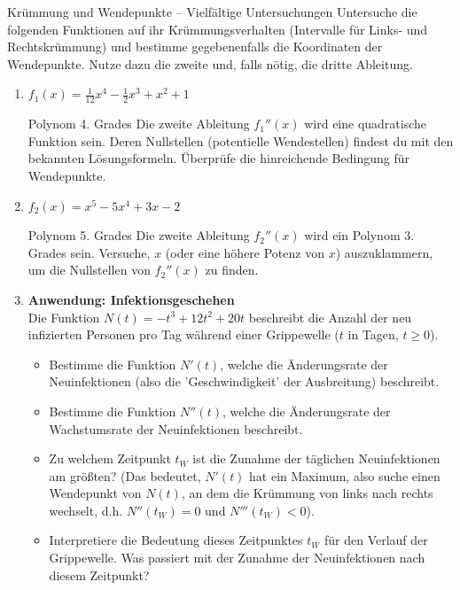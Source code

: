\begin{aufgabenumgebung}{Krümmung und Wendepunkte – Vielfältige Untersuchungen}
Untersuche die folgenden Funktionen auf ihr Krümmungsverhalten (Intervalle für Links- und Rechtskrümmung) und bestimme gegebenenfalls die Koordinaten der Wendepunkte. Nutze dazu die zweite und, falls nötig, die dritte Ableitung.
\begin{enumerate}
    \item $f_1(x) = \frac{1}{12}x^4 - \frac{1}{2}x^3 + x^2 + 1$
        \begin{tippumgebung}{Polynom 4. Grades}
        Die zweite Ableitung $f_1''(x)$ wird eine quadratische Funktion sein. Deren Nullstellen (potentielle Wendestellen) findest du mit den bekannten Lösungsformeln. Überprüfe die hinreichende Bedingung für Wendepunkte.
        \end{tippumgebung}

    \item $f_2(x) = x^5 - 5x^4 + 3x - 2$
        \begin{tippumgebung}{Polynom 5. Grades}
        Die zweite Ableitung $f_2''(x)$ wird ein Polynom 3. Grades sein. Versuche, $x$ (oder eine höhere Potenz von $x$) auszuklammern, um die Nullstellen von $f_2''(x)$ zu finden.
        \end{tippumgebung}

    \item \textbf{Anwendung: Infektionsgeschehen} \\
        Die Funktion $N(t) = -t^3 + 12t^2 + 20t$ beschreibt die Anzahl der neu infizierten Personen pro Tag während einer Grippewelle ($t$ in Tagen, $t \ge 0$).
        \begin{itemize}
            \item Bestimme die Funktion $N'(t)$, welche die Änderungsrate der Neuinfektionen (also die 'Geschwindigkeit' der Ausbreitung) beschreibt.
            \item Bestimme die Funktion $N''(t)$, welche die Änderungsrate der Wachstumsrate der Neuinfektionen beschreibt.
            \item Zu welchem Zeitpunkt $t_W$ ist die Zunahme der täglichen Neuinfektionen am größten? (Das bedeutet, $N'(t)$ hat ein Maximum, also suche einen Wendepunkt von $N(t)$, an dem die Krümmung von links nach rechts wechselt, d.h. $N''(t_W)=0$ und $N'''(t_W)<0$).
            \item Interpretiere die Bedeutung dieses Zeitpunktes $t_W$ für den Verlauf der Grippewelle. Was passiert mit der Zunahme der Neuinfektionen nach diesem Zeitpunkt?
        \end{itemize}


\end{enumerate}
\end{aufgabenumgebung}
